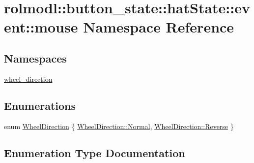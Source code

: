 \hypertarget{namespacerolmodl_1_1button__state_1_1hat_state_1_1event_1_1mouse}{}\section{rolmodl\+::button\+\_\+state\+::hat\+State\+::event\+::mouse Namespace Reference}
\label{namespacerolmodl_1_1button__state_1_1hat_state_1_1event_1_1mouse}
\subsection*{Namespaces}
\begin{DoxyCompactItemize}
\item 
 \mbox{\hyperlink{namespacerolmodl_1_1button__state_1_1hat_state_1_1event_1_1mouse_1_1wheel__direction}{wheel\+\_\+direction}}
\end{DoxyCompactItemize}
\subsection*{Enumerations}
\begin{DoxyCompactItemize}
\item 
enum \mbox{\hyperlink{namespacerolmodl_1_1button__state_1_1hat_state_1_1event_1_1mouse_a203bba850745831e5abea03c154853dd}{Wheel\+Direction}} \{ \mbox{\hyperlink{namespacerolmodl_1_1button__state_1_1hat_state_1_1event_1_1mouse_a203bba850745831e5abea03c154853dda960b44c579bc2f6818d2daaf9e4c16f0}{Wheel\+Direction\+::\+Normal}}, 
\mbox{\hyperlink{namespacerolmodl_1_1button__state_1_1hat_state_1_1event_1_1mouse_a203bba850745831e5abea03c154853dda67f115c1fddc4ce1aeb1c754001585bc}{Wheel\+Direction\+::\+Reverse}}
 \}
\end{DoxyCompactItemize}


\subsection{Enumeration Type Documentation}
\mbox{\label{namespacerolmodl_1_1button__state_1_1hat_state_1_1event_1_1mouse_a203bba850745831e5abea03c154853dd}} 
